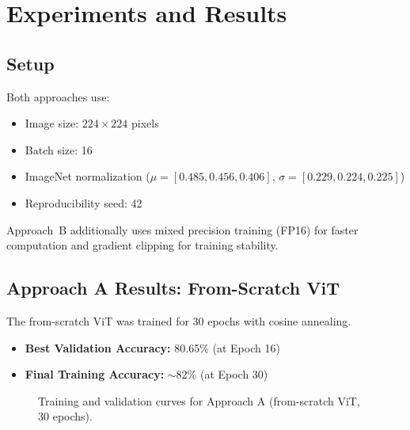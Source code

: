 \documentclass[10pt,twocolumn,letterpaper]{article}
\begin{document}
\section{Experiments and Results}

\subsection{Setup}

Both approaches use:
\begin{itemize}[leftmargin=*, itemsep=1pt]
    \item Image size: $224 \times 224$ pixels
    \item Batch size: 16
    \item ImageNet normalization ($\mu = [0.485, 0.456, 0.406]$, $\sigma = [0.229, 0.224, 0.225]$)
    \item Reproducibility seed: 42
\end{itemize}

Approach~B additionally uses mixed precision training (FP16) for faster computation and gradient clipping for training stability.


\subsection{Approach A Results: From-Scratch ViT}

The from-scratch ViT was trained for 30 epochs with cosine annealing.

\begin{itemize}[leftmargin=*, itemsep=2pt]
    \item \textbf{Best Validation Accuracy:} 80.65\% (at Epoch 16)
    \item \textbf{Final Training Accuracy:} $\sim$82\% (at Epoch 30)
\end{itemize}

\begin{figure}[h]
\centering
{}
\caption{Training and validation curves for Approach A (from-scratch ViT, 30 epochs).}
\label{fig:approach_a_curves}
\end{figure}
\end{document}
